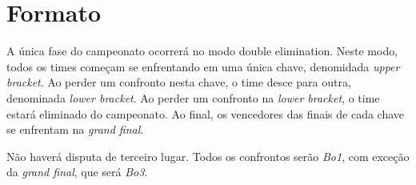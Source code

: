 \section{Formato}

A única fase do campeonato ocorrerá no modo double elimination. Neste modo, todos os times começam se enfrentando em uma única chave, denomidada \textit{upper bracket}. Ao perder um confronto nesta chave, o time desce para outra, denominada \textit{lower bracket}. Ao perder um confronto na \textit{lower bracket}, o time estará eliminado do campeonato. Ao final, os vencedores das finais de cada chave se enfrentam na \textit{grand final}.

Não haverá disputa de terceiro lugar. Todos os confrontos serão \textit{Bo1}, com exceção da \textit{grand final}, que será \textit{Bo3}.



